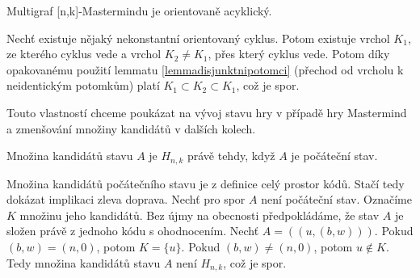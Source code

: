 \begin{lemma}
    Multigraf [n,k]-Mastermindu je orientovaně acyklický. 
\end{lemma}
\begin{dukaz}
    Nechť existuje nějaký nekonstantní orientovaný cyklus. Potom existuje vrchol $K_1$, ze kterého cyklus vede a vrchol $K_2 \neq K_1$, přes který cyklus vede. Potom díky opakovanému použití lemmatu \ref{lemmadisjunktnipotomci} (přechod od vrcholu k neidentickým potomkům) platí $K_1 \subset K_2 \subset K_1$, což je spor. 
\end{dukaz}
Touto vlastností chceme poukázat na vývoj stavu hry v případě hry Mastermind a zmenšování množiny kandidátů v dalších kolech. 

\begin{lemma}\label{lemmakandidatipocstavu}
    Množina kandidátů stavu $A$ je $H_{n,k}$ právě tehdy, když $A$ je počáteční stav.
\end{lemma}
\begin{dukaz}
    Množina kandidátů počátečního stavu je z definice celý prostor kódů. Stačí tedy dokázat implikaci zleva doprava. Nechť pro spor $A$ není počáteční stav. Označíme $K$ množinu jeho kandidátů. Bez újmy na obecnosti předpokládáme, že stav $A$ je složen právě z jednoho kódu s ohodnocením. Nechť $A = ((u, (b,w)))$. Pokud $(b,w) = (n,0)$, potom $K = \{u\}$. Pokud $(b,w) \neq (n,0)$, potom $u \notin K$. Tedy množina kandidátů stavu $A$ není $H_{n,k}$, což je spor. 
\end{dukaz}

